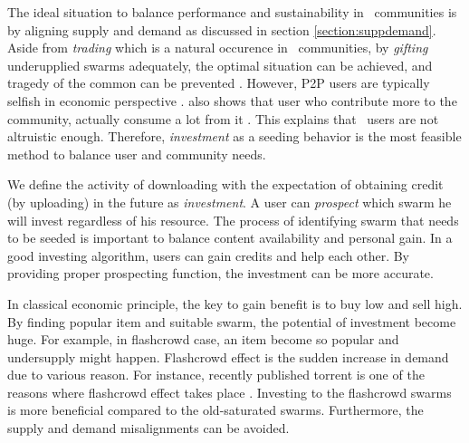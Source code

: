 The ideal situation to balance performance and sustainability in \bt~communities is by aligning supply and demand as discussed in section \ref{section:suppdemand}. Aside from \textit{trading} which is a natural occurence in \bt~communities, by \textit{gifting} underupplied swarms adequately, the optimal situation can be achieved, and tragedy of the common can be prevented \cite{2002:reputationtotragedy:milinski}. However, P2P users are typically selfish in economic perspective \cite{2014:userbehaviourprivate:jia}. \citeauthor{2009:demandsupplyres:andrade} also shows that user who contribute more to the community, actually consume a lot from it \cite{2009:demandsupplyres:andrade}. This explains that \bt~users are not altruistic enough. Therefore, \textit{investment} as a seeding behavior is the most feasible method to balance user and community needs.

We define the activity of downloading with the expectation of obtaining credit (by uploading) in the future as \textit{investment}. A user can \textit{prospect} which swarm he will invest regardless of his resource. The process of identifying swarm that needs to be seeded is important to balance content availability and personal gain. In a good investing algorithm, users can gain credits and help each other. By providing proper prospecting function, the investment can be more accurate.


In classical economic principle, the key to gain benefit is to buy low and sell high. By finding popular item and suitable swarm, the potential of investment become huge. For example, in flashcrowd case, an item become so popular and undersupply might happen. Flashcrowd effect is the sudden increase in demand due to various reason. For instance, recently published torrent is one of the reasons where flashcrowd effect takes place \cite{2013:swarmevolution:su}. Investing to the flashcrowd swarms is more beneficial compared to the old-saturated swarms. Furthermore, the supply and demand misalignments can be avoided.


